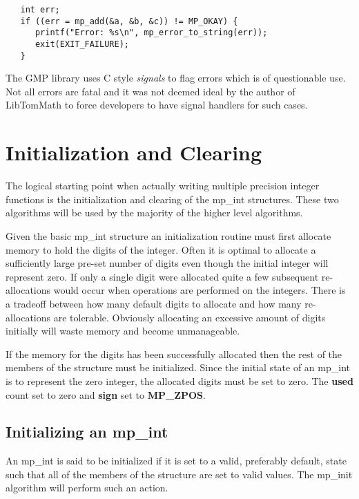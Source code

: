 \documentclass[b5paper]{book}
\begin{document}
\begin{verbatim}
   int err;
   if ((err = mp_add(&a, &b, &c)) != MP_OKAY) {
      printf("Error: %s\n", mp_error_to_string(err));
      exit(EXIT_FAILURE);
   }
\end{verbatim}

The GMP \cite{GMP} library uses C style \textit{signals} to flag errors which is of questionable use.  Not all errors are fatal 
and it was not deemed ideal by the author of LibTomMath to force developers to have signal handlers for such cases.

\section{Initialization and Clearing}
The logical starting point when actually writing multiple precision integer functions is the initialization and 
clearing of the mp\_int structures.  These two algorithms will be used by the majority of the higher level algorithms.

Given the basic mp\_int structure an initialization routine must first allocate memory to hold the digits of
the integer.  Often it is optimal to allocate a sufficiently large pre-set number of digits even though
the initial integer will represent zero.  If only a single digit were allocated quite a few subsequent re-allocations
would occur when operations are performed on the integers.  There is a tradeoff between how many default digits to allocate
and how many re-allocations are tolerable.  Obviously allocating an excessive amount of digits initially will waste 
memory and become unmanageable.  

If the memory for the digits has been successfully allocated then the rest of the members of the structure must
be initialized.  Since the initial state of an mp\_int is to represent the zero integer, the allocated digits must be set
to zero.  The \textbf{used} count set to zero and \textbf{sign} set to \textbf{MP\_ZPOS}.

\subsection{Initializing an mp\_int}
An mp\_int is said to be initialized if it is set to a valid, preferably default, state such that all of the members of the
structure are set to valid values.  The mp\_init algorithm will perform such an action.
\end{document}
